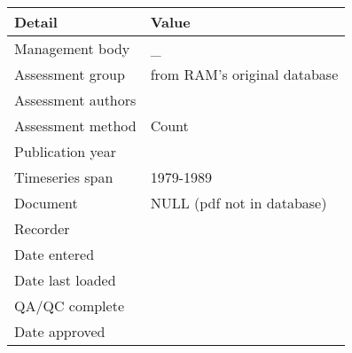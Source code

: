 \begin{table}[htb]
\centering
\begin{tabular}{ll}
\toprule
Detail & Value \\
\midrule
Management body    & \_                           \\
Assessment group   & from RAM's original database \\
Assessment authors &                              \\
Assessment method  & Count                        \\
Publication year   &                              \\
Timeseries span    & 1979-1989                    \\
Document           & NULL (pdf not in database)   \\
Recorder           &                              \\
Date entered       &                              \\
Date last loaded   &                              \\
QA/QC complete     &                              \\
Date approved      &                              \\
\bottomrule
\end{tabular}
\label{tab:assessdet}
\end{table}
